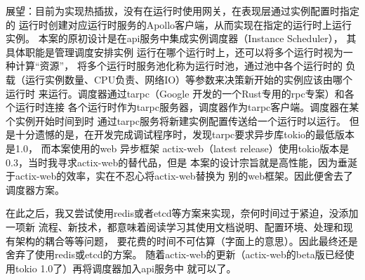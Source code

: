 \begin{keturon}
    展望：目前为实现热插拔，没有在运行时使用网关，在表现层通过实例配置时指定的
    运行时创建对应运行时服务的Apollo客户端，从而实现在指定的运行时上运行实例。
    本案的原初设计是在api服务中集成实例调度器（Instance Scheduler），
    其具体职能是管理调度安排实例
    运行在哪个运行时上，还可以将多个运行时视为一种计算“资源”，
    将多个运行时服务池化称为运行时池，通过池中各个运行时的
    负载（运行实例数量、CPU负责、网络IO）等参数来决策新开始的实例应该由哪个运行时
    来运行。调度器通过tarpc（Google 开发的一个Rust专用的rpc专案）和各个运行时连接
    各个运行时作为tarpc服务器，调度器作为tarpc客户端。调度器在某个实例开始时间到时
    通过tarpc服务将新建实例配置传送给一个运行时以运行。
    但是十分遗憾的是，在开发完成调试程序时，发现tarpc要求异步库tokio的最低版本是1.0，
    而本案使用的web 异步框架
    actix-web（latest release）使用tokio版本是0.3，当时我寻求actix-web的替代品，但是
    本案的设计宗旨就是高性能，因为垂涎于actix-web的效率，实在不忍心将actix-web替换为
    别的web框架。因此便舍去了调度器方案。

    在此之后，我又尝试使用redis或者etcd等方案来实现，奈何时间过于紧迫，没添加一项新
    流程、新技术，都意味着阅读学习其使用文档说明、配置环境、处理和现有架构的耦合等等问题，
    要花费的时间不可估算（字面上的意思）。因此最终还是舍弃了使用redis或etcd的方案。
    随着actix-web的更新（actix-web的beta版已经使用tokio 1.0了）再将调度器加入api服务中
    就可以了。
\end{keturon}